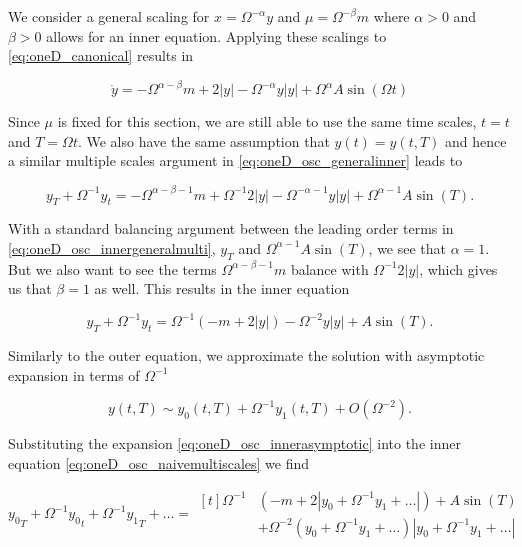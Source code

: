 We consider a general scaling for $x=\Omega^{-\alpha}y$ and $\mu = \Omega^{-\beta}m$ where $\alpha>0$ and $\beta>0$ allows for an inner equation. Applying these scalings to \eqref{eq:oneD_canonical} results in

\begin{equation}\label{eq:oneD_osc_generalinner}
\dot{y} = -\Omega^{\alpha-\beta}m+2|y|-\Omega^{-\alpha}y|y|+\Omega^{\alpha}A\sin(\Omega t)
\end{equation}

Since $\mu$ is fixed for this section, we are still able to use the same time scales, $t=t$ and $T=\Omega t$. We also have the same assumption that $y(t)=y(t,T)$ and hence a similar multiple scales argument in \eqref{eq:oneD_osc_generalinner} leads to

\begin{equation}\label{eq:oneD_osc_innergeneralmulti}
y_T+\Omega^{-1}y_t = - \Omega^{\alpha-\beta-1}m+\Omega^{-1}2|y|-\Omega^{-\alpha-1}y|y|+\Omega^{\alpha-1}A\sin(T).
\end{equation}

With a standard balancing argument between the leading order terms in \eqref{eq:oneD_osc_innergeneralmulti}, $y_T$ and $\Omega^{\alpha-1} A\sin(T)$, we see that $\alpha=1$. But we also want to see the terms $\Omega^{\alpha-\beta-1}m$ balance with $\Omega^{-1}2|y|$, which gives us that $\beta=1$ as well. This results in the inner equation

\begin{equation}\label{eq:oneD_osc_naivemultiscales}
y_T+\Omega^{-1}y_t = \Omega^{-1}\left(-m+2|y|\right)-\Omega^{-2}y|y|+A\sin(T).
\end{equation}

Similarly to the outer equation, we approximate the solution with asymptotic expansion in terms of $\Omega^{-1}$ 

\begin{equation}\label{eq:oneD_osc_innerasymptotic}
y(t,T)\sim y_0(t,T)+\Omega^{-1}y_1(t,T)+O(\Omega^{-2}).
\end{equation}

Substituting the expansion \eqref{eq:oneD_osc_innerasymptotic} into the inner equation \eqref{eq:oneD_osc_naivemultiscales} we find

\begin{equation*}
{y_0}_T+\Omega^{-1}{y_0}_t+\Omega^{-1}{y_1}_T+\ldots =\begin{aligned}[t]\Omega^{-1}&(-m+2|y_0+\Omega^{-1}y_1+\ldots|)+A\sin(T)\\
&+\Omega^{-2}(y_0+\Omega^{-1}y_1+\ldots)|y_0+\Omega^{-1}y_1+\ldots|
\end{aligned}
\end{equation*}

